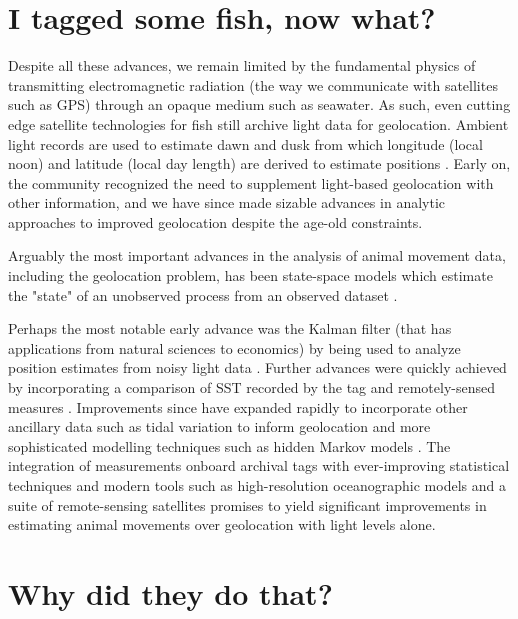 \section{I tagged some fish, now what?}\label{sec:geo}
Despite all these advances, we remain limited by the fundamental physics of transmitting electromagnetic radiation (the way we communicate with satellites such as GPS) through an opaque medium such as seawater. As such, even cutting edge satellite technologies for fish still archive light data for geolocation. Ambient light records are used to estimate dawn and dusk from which longitude (local noon) and latitude (local day length) are derived to estimate positions \citep{Hill1994, Hill2001}. Early on, the community recognized the need to supplement light-based geolocation with other information, and we have since made sizable advances in analytic approaches to improved geolocation despite the age-old constraints. 

Arguably the most important advances in the analysis of animal movement data, including the geolocation problem, has been state-space models which estimate the "state" of an unobserved process from an observed dataset \citep{Jonsen2013}. 

Perhaps the most notable early advance was the Kalman filter (that has applications from natural sciences to economics) by \cite{Sibert2001} being used to analyze position estimates from noisy light data \citep{Hill2001}. Further advances were quickly achieved by incorporating a comparison of \is SST recorded by the tag and remotely-sensed measures \citep{Teo2004, Nielsen2006}. Improvements since have expanded rapidly to incorporate other ancillary data such as tidal variation \citep[\eg][]{Metcalfe1997} to inform geolocation and more sophisticated modelling techniques such as hidden Markov models \citep[\eg][]{Pedersen2008}. The integration of \is measurements onboard archival tags with ever-improving statistical techniques and modern tools such as high-resolution oceanographic models and a suite of remote-sensing satellites promises to yield significant improvements in estimating animal movements over geolocation with light levels alone.

\section{Why did they do that?}


